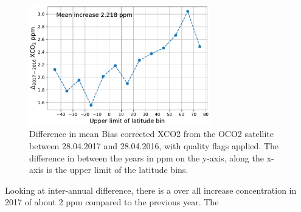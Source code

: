 \begin{figure}[htbp]
    \centering
    \includegraphics[width=0.7\textwidth]{../deltaXco2.pdf}
    \caption{Difference in mean Bias corrected XCO2 from the OCO2 satellite
    between 28.04.2017 and 28.04.2016, with quality flags applied. The
    difference in  between the years in ppm on the
    y-axis, along the x-axis is the upper limit of
    the latitude bins.}
    \label{fig:Deltaqa_xco2}

\end{figure}


Looking at inter-annual difference, there is a over all increase 
concentration in 2017 of about 2 ppm compared to the previous year. The    